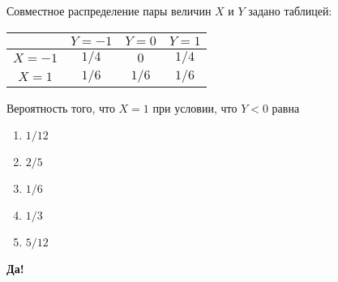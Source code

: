\documentclass[t]{beamer}
\begin{document}
 \begin{frame} \label{14-Yes} 
\begin{block}{14} 

Совместное распределение пары величин $X$ и $Y$ задано таблицей:
\begin{center}
\begin{tabular}{@{}c|ccc@{}}
\toprule
       & $Y=-1$ & $Y=0$ & $Y=1$ \\ \midrule
$X=-1$ & $1/4$  & $0$   & $1/4$ \\
$X=1$  & $1/6$  & $1/6$ & $1/6$ \\ \bottomrule
\end{tabular}
\end{center}

\vspace{0.5cm} 
 
 
Вероятность того, что $X=1$ при условии, что $Y<0$ равна
 


 \end{block} 
\begin{enumerate} 
\item[] \hyperlink{14-No}{\beamergotobutton{} $1/12$}
\item[] \hyperlink{14-Yes}{\beamergotobutton{} $2/5$}
\item[] \hyperlink{14-No}{\beamergotobutton{} $1/6$}
\item[] \hyperlink{14-No}{\beamergotobutton{} $1/3$
}
\item[] \hyperlink{14-No}{\beamergotobutton{} $5/12$}
\end{enumerate} 

 \textbf{Да!} 
 \hyperlink{15}{}\end{frame} 
\end{document}

